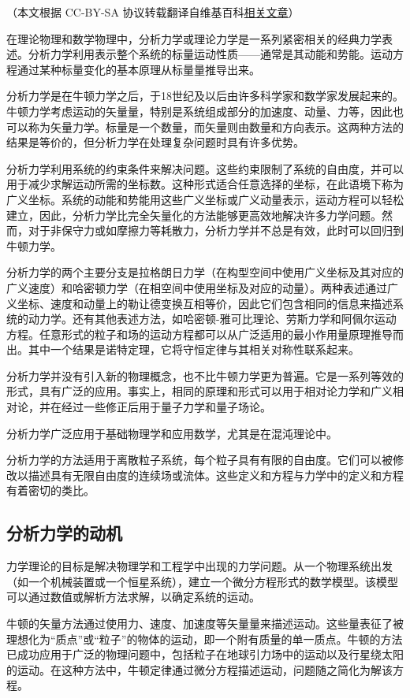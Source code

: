 
（本文根据 CC-BY-SA 协议转载翻译自维基百科\href{https://en.wikipedia.org/wiki/Analytical_mechanics}{相关文章}）

在理论物理和数学物理中，分析力学或理论力学是一系列紧密相关的经典力学表述。分析力学利用表示整个系统的标量运动性质——通常是其动能和势能。运动方程通过某种标量变化的基本原理从标量量推导出来。

分析力学是在牛顿力学之后，于18世纪及以后由许多科学家和数学家发展起来的。牛顿力学考虑运动的矢量量，特别是系统组成部分的加速度、动量、力等，因此也可以称为矢量力学。标量是一个数量，而矢量则由数量和方向表示。这两种方法的结果是等价的，但分析力学在处理复杂问题时具有许多优势。

分析力学利用系统的约束条件来解决问题。这些约束限制了系统的自由度，并可以用于减少求解运动所需的坐标数。这种形式适合任意选择的坐标，在此语境下称为广义坐标。系统的动能和势能用这些广义坐标或广义动量表示，运动方程可以轻松建立，因此，分析力学比完全矢量化的方法能够更高效地解决许多力学问题。然而，对于非保守力或如摩擦力等耗散力，分析力学并不总是有效，此时可以回归到牛顿力学。

分析力学的两个主要分支是拉格朗日力学（在构型空间中使用广义坐标及其对应的广义速度）和哈密顿力学（在相空间中使用坐标及对应的动量）。两种表述通过广义坐标、速度和动量上的勒让德变换互相等价，因此它们包含相同的信息来描述系统的动力学。还有其他表述方法，如哈密顿-雅可比理论、劳斯力学和阿佩尔运动方程。任意形式的粒子和场的运动方程都可以从广泛适用的最小作用量原理推导而出。其中一个结果是诺特定理，它将守恒定律与其相关对称性联系起来。

分析力学并没有引入新的物理概念，也不比牛顿力学更为普遍。它是一系列等效的形式，具有广泛的应用。事实上，相同的原理和形式可以用于相对论力学和广义相对论，并在经过一些修正后用于量子力学和量子场论。

分析力学广泛应用于基础物理学和应用数学，尤其是在混沌理论中。

分析力学的方法适用于离散粒子系统，每个粒子具有有限的自由度。它们可以被修改以描述具有无限自由度的连续场或流体。这些定义和方程与力学中的定义和方程有着密切的类比。
\subsection{分析力学的动机}
力学理论的目标是解决物理学和工程学中出现的力学问题。从一个物理系统出发（如一个机械装置或一个恒星系统），建立一个微分方程形式的数学模型。该模型可以通过数值或解析方法求解，以确定系统的运动。

牛顿的矢量方法通过使用力、速度、加速度等矢量量来描述运动。这些量表征了被理想化为“质点”或“粒子”的物体的运动，即一个附有质量的单一质点。牛顿的方法已成功应用于广泛的物理问题中，包括粒子在地球引力场中的运动以及行星绕太阳的运动。在这种方法中，牛顿定律通过微分方程描述运动，问题随之简化为解该方程。

